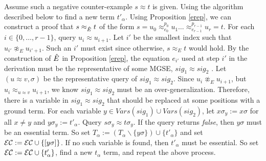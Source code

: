 Assume such a negative counter-example $s\approx t$ is given.
Using the algorithm described below to find a new term $t'_\alpha$.
Using Proposition \ref{erep}, we can construct a proof that $s \approx_{\ahat{E}} t$ of the form $s = u_0 \approx_{e_0}^{p_0} u_1 \dots \approx_{e_{r-1}}^{p_{r-1}} u_r = t$. 
For each $i \in \{0,\dots, r-1\}$, query $u_i \approx u_{i+1}$. 
Let $i'$ be the smallest index such that $u_{i'} \not\approx_E u_{i'+1}$. 
Such an $i'$ must exist since otherwise, $s \approx_E t$ would hold.
By the construction of $\ahat{E}$ in Proposition \ref{erep}, the equation $e_{i'}$ used at step $i'$ in the derivation must be the representative of some MGSE, $sig_1 \approx sig_2$ .
Let $(u\approx v,\sigma)$ be the representative query of $sig_1 \approx sig_2$.
Since $u_i \not\approx_E u_{i+1}$, but $u_i \approx_{u\approx v} u_{i+1}$, we know $sig_1 \approx sig_2$ must be an over-generalization. 
Therefore, there is a variable in $sig_1 \approx sig_2$ that should be replaced at some positions with a ground term.
For each variable $y \in Vars(sig_1) \cup Vars(sig_2)$, let $x \sigma_y:=x \sigma$ for all $x \ne y$ and $y \sigma_y  := t'_\alpha$.
Query $s\sigma_y  \approx t \sigma_y$. 
If the query returns \emph{false}, then $y \sigma$ must be an essential term. 
So set $T_\alpha := (T_\alpha \backslash \{y \sigma\}) \cup \{t'_\alpha\}$ and set ${\mathcal{E}\mathcal{C}} := {\mathcal{E}\mathcal{C}} \cup \{ [y \sigma] \}$.
If no such variable is found, then $t'_\alpha$ must be essential. 
So set ${\mathcal{E}\mathcal{C}} := {\mathcal{E}\mathcal{C}} \cup \{ t'_\alpha \}$, find a new $t_\alpha$ term, and repeat the above process. 



